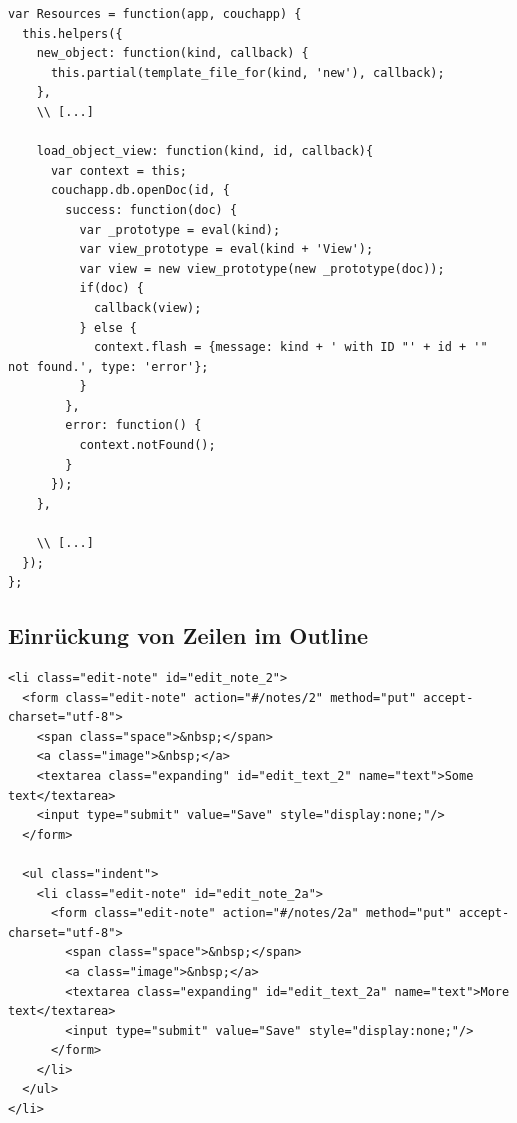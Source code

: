 \lstset{language=javascript}
\medskip 
\begin{lstlisting}[label=code:resources, caption=Auszug aus {\fontfamily{pcr}\selectfont /\_attachments/app/lib/resources.js}]
var Resources = function(app, couchapp) {
  this.helpers({
    new_object: function(kind, callback) {
      this.partial(template_file_for(kind, 'new'), callback);
    },
    \\ [...]
    
    load_object_view: function(kind, id, callback){
      var context = this;
      couchapp.db.openDoc(id, {
        success: function(doc) {
          var _prototype = eval(kind);
          var view_prototype = eval(kind + 'View');
          var view = new view_prototype(new _prototype(doc));
          if(doc) {            
            callback(view);            
          } else {
            context.flash = {message: kind + ' with ID "' + id + '" not found.', type: 'error'};
          }
        },
        error: function() {
          context.notFound();
        }
      });
    },

    \\ [...]
  });
};
\end{lstlisting}



\subsection{Einrückung von Zeilen im Outline}


\lstset{language=html}
\medskip 
\begin{lstlisting}[label=code:outline-indent, caption=Zeile mit einem Kindknoten]
<li class="edit-note" id="edit_note_2">
  <form class="edit-note" action="#/notes/2" method="put" accept-charset="utf-8">
    <span class="space">&nbsp;</span>
    <a class="image">&nbsp;</a>
    <textarea class="expanding" id="edit_text_2" name="text">Some text</textarea>
    <input type="submit" value="Save" style="display:none;"/>
  </form>

  <ul class="indent">
    <li class="edit-note" id="edit_note_2a">
      <form class="edit-note" action="#/notes/2a" method="put" accept-charset="utf-8">
        <span class="space">&nbsp;</span>
        <a class="image">&nbsp;</a>
        <textarea class="expanding" id="edit_text_2a" name="text">More text</textarea>
        <input type="submit" value="Save" style="display:none;"/>
      </form>
    </li>
  </ul>
</li>
\end{lstlisting}




